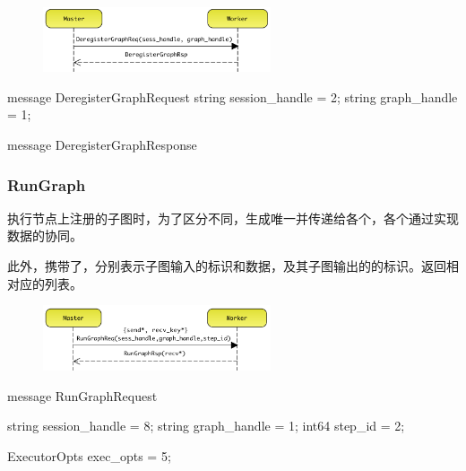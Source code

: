 \begin{content}
\begin{figure}[H]
\centering
\includegraphics[width=0.6\textwidth]{figures/dist-worker-deregister-graph.png}
\caption{}
 \label{fig:dist-worker-deregister-graph}
\end{figure}

\begin{leftbar}
\begin{c++}
message DeregisterGraphRequest {
  string session_handle = 2;
  string graph_handle = 1;
}

message DeregisterGraphResponse {
}
\end{c++}
\end{leftbar}

\subsubsection{RunGraph}

执行节点上注册的子图时，为了区分不同，生成唯一并传递给各个，各个通过实现数据的协同。

此外，携带了，分别表示子图输入的标识和数据，及其子图输出的的标识。返回相对应的列表。

\begin{figure}[H]
\centering
\includegraphics[width=0.6\textwidth]{figures/dist-worker-run-graph.png}
\caption{}
 \label{fig:dist-worker-run-graph}
\end{figure}

\begin{leftbar}
\begin{c++}
message RunGraphRequest {
  string session_handle = 8;
  string graph_handle = 1;
  int64 step_id = 2;

  ExecutorOpts exec_opts = 5;

}
\end{c++}
\end{leftbar}
\end{content}
